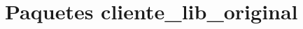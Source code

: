 \hypertarget{namespacecliente__lib__original}{
\section{Paquetes cliente\_\-lib\_\-original}
\label{namespacecliente__lib__original}
}
